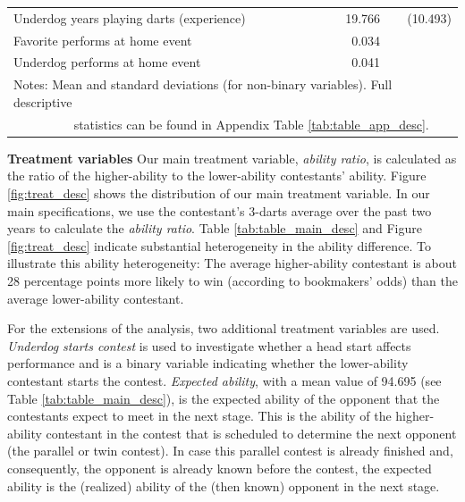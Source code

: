 \documentclass[11pt,a4paper]{article}
\begin{document}
\begin{table}[H]
\begin{tabular}{l r r r}
            Underdog years playing darts (experience)    & &  19.766     & (10.493)  \\
            Favorite performs at home event              & &   0.034     &           \\
            Underdog performs at home event              & &   0.041     &           \\
			\bottomrule \bottomrule
			\multicolumn{4}{l}{\footnotesize Notes: Mean and standard deviations (for non-binary variables). Full descriptive}\\
			\multicolumn{4}{l}{\footnotesize ~~~~~~~~~    statistics can be found in Appendix Table \ref{tab:table_app_desc}.}
		\end{tabular}
	\end{table}

\textbf{Treatment variables} Our main treatment variable, \textit{ability ratio}, is calculated as the ratio of the higher-ability to the lower-ability contestants' ability. Figure \ref{fig:treat_desc} shows the distribution of our main treatment variable. In our main specifications, we use the contestant's 3-darts average over the past two years to calculate the \textit{ability ratio}. Table \ref{tab:table_main_desc} and Figure \ref{fig:treat_desc} indicate substantial heterogeneity in the ability difference. To illustrate this ability heterogeneity: The average higher-ability contestant is about 28 percentage points more likely to win (according to bookmakers' odds) than the average lower-ability contestant.\par

For the extensions of the analysis, two additional treatment variables are used. \textit{Underdog starts contest} is used to investigate whether a head start affects performance and is a binary variable indicating whether the lower-ability contestant starts the contest. \textit{Expected ability}, with a mean value of 94.695 (see Table \ref{tab:table_main_desc}), is the expected ability of the opponent that the contestants expect to meet in the next stage. This is the ability of the higher-ability contestant in the contest that is scheduled to determine the next opponent (the parallel or twin contest). In case this parallel contest is already finished and, consequently, the opponent is already known before the contest, the expected ability is the (realized) ability of the (then known) opponent in the next stage.\par
\end{document}
